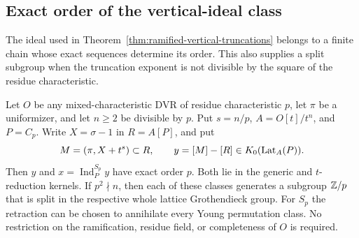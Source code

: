 \subsection{Exact order of the vertical-ideal class}

The ideal used in Theorem~\ref{thm:ramified-vertical-truncations}
belongs to a finite chain whose exact sequences determine its order.
This also supplies a split subgroup when the truncation exponent is
not divisible by the square of the residue characteristic.

\begin{theorem}\label{thm:vertical-ideal-exact-order}
Let $O$ be any mixed-characteristic DVR of residue characteristic $p$,
let $\pi$ be a uniformizer, and let $n\geq2$ be divisible by $p$.
Put $s=n/p$, $A=O[t]/t^n$, and $P=C_p$.  Write $X=\sigma-1$ in
$R=A[P]$, and put
\[
 M=(\pi,X+t^s)\subset R,\qquad
 y=[M]-[R]\in K_0(\operatorname{Lat}_A(P)).
\]
Then $y$ and $x=\operatorname{Ind}_P^{S_p}y$ have exact order $p$.
Both lie in the generic and $t$-reduction kernels.  If $p^2\nmid n$,
then each of these classes generates a subgroup $\mathbb Z/p$ that is split
in the respective whole lattice Grothendieck group.  For $S_p$ the
retraction can be chosen to annihilate every Young permutation class.
No restriction on the ramification, residue field, or completeness of
$O$ is required.
\end{theorem}

